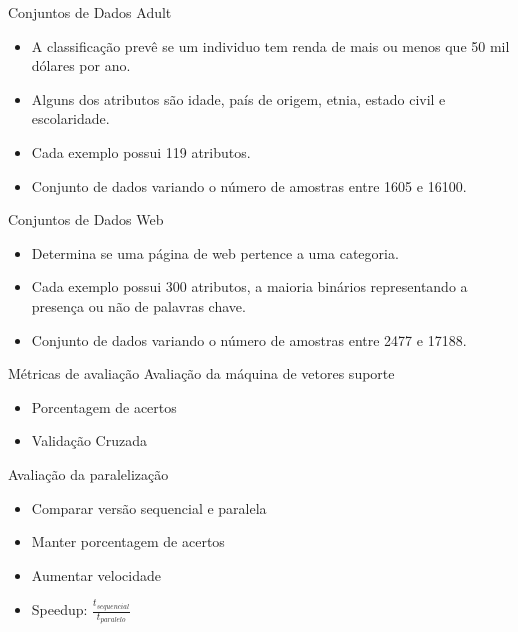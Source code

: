 \documentclass{beamer}
\begin{document}
\begin{frame}{Conjuntos de Dados}
    Adult
    \begin{itemize}
        \item A classificação prevê se um individuo tem renda de mais ou menos que 50 mil dólares por ano.
        \item Alguns dos atributos são idade, país de origem, etnia, estado civil e escolaridade.
        \item Cada exemplo possui 119 atributos.
        \item Conjunto de dados variando o número de amostras entre 1605 e 16100.
    \end{itemize}
\end{frame}

\begin{frame}{Conjuntos de Dados}
    Web
    \begin{itemize}
        \item  Determina se uma página de web pertence a uma categoria.
        \item Cada exemplo possui 300 atributos, a maioria binários representando a presença ou não de palavras chave.
        \item Conjunto de dados variando o número de amostras entre 2477 e 17188.
    \end{itemize}
\end{frame}

\begin{frame}{Métricas de avaliação}
    Avaliação da máquina de vetores suporte
    \begin{itemize}
        \item Porcentagem de acertos
        \item Validação Cruzada
    \end{itemize}
    Avaliação da paralelização
    \begin{itemize}
        \item Comparar versão sequencial e paralela
        \item Manter porcentagem de acertos
        \item Aumentar velocidade
        \item Speedup: $\frac{t_{sequencial}}{t_{paralelo}}$
    \end{itemize}
\end{frame}
\end{document}
